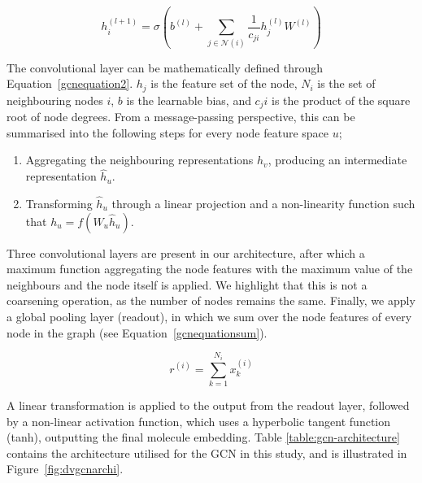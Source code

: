 \begin{equation}
    \label{gcnequation2}
    h_i^{(l+1)} = \sigma(b^{(l)} + \sum_{j\in\mathcal{N}(i)}\frac{1}{c_{ji}}h_j^{(l)}W^{(l)})
\end{equation}

The convolutional layer can be mathematically defined through Equation~\ref{gcnequation2}. $h_j$ is the feature set of the node, $N_i$ is the set of neighbouring nodes $i$, $b$ is the learnable bias, and $c_ji$ is the product of the square root of node degrees. From a message-passing perspective, this can be summarised into the following steps for every node feature space $u$;

\begin{enumerate}
    \item Aggregating the neighbouring representations $h_v$, producing an intermediate representation $\hat{h}_u$.
    \item Transforming $\hat{h}_u$ through a linear projection and a non-linearity function such that $h_u = f(W_u \hat{h}_u)$. \citep{kipf2016semi}
\end{enumerate}

Three convolutional layers are present in our architecture, after which a maximum function aggregating the node features with the maximum value of the neighbours and the node itself is applied. We highlight that this is not a coarsening operation, as the number of nodes remains the same. Finally, we apply a global pooling layer (readout), in which we sum over the node features of every node in the graph (see Equation~\ref{gcnequationsum}). 

\begin{equation}
    \label{gcnequationsum}
    r^{(i)} = \sum_{k=1}^{N_i} x^{(i)}_k
\end{equation}

A linear transformation is applied to the output from the readout layer, followed by a non-linear activation function, which uses a hyperbolic tangent function (tanh), outputting the final molecule embedding. Table \ref{table:gcn-architecture} contains the architecture utilised for the GCN in this study, and is illustrated in Figure~\ref{fig:dvgcnarchi}.


